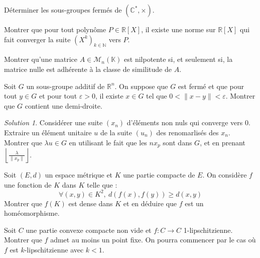 \documentclass[french]{book}
\newcommand{\N}{\mathbb{N}}
\newcommand{\R}{\mathbb{R}}
\newcommand{\C}{\mathbb{C}}
\newcommand{\K}{\mathbb{K}}
\newcommand{\st}{^*}
\theoremstyle{definition}
\theoremstyle{remark}
\newtheorem*{sol}{Solution}
\begin{document}
\begin{exo}[2]{}
	Déterminer les sous-groupes fermés de $(\C\st,\times)$.
\end{exo}

\begin{exo}[2]{}
	Montrer que pour tout polynôme $P\in\R[X]$, il existe une norme sur $\R[X]$ qui fait converger la suite $(X^k)_{k\in\N}$ vers $P$.
\end{exo}

\begin{exo}[2]{}
	Montrer qu'une matrice $A\in\mathcal{M}_n(\K)$ est nilpotente si, et seulement si, la matrice nulle est adhérente à la classe de similitude de $A$.
\end{exo}

\begin{exo}[2]{}
	Soit $G$ un sous-groupe additif de $\R^n$. On suppose que $G$ est fermé et que pour tout $y\in G$ et pour tout $\varepsilon>0$, il existe $x\in G$ tel que $0<\lVert x-y\rVert<\varepsilon$. Montrer que $G$ contient une demi-droite.
\end{exo}
\begin{sol}
	Considérer une suite $(x_n)$ d'éléments non nuls qui converge vers $0$. Extraire un élément unitaire $u$ de la suite $(u_n)$ des renomarlisés des $x_n$. Montrer que $\lambda u\in G$ en utilisant le fait que les $nx_p$ sont dans $G$, et en prenant $\displaystyle\left\lfloor\frac{\lambda}{\lVert x_p\rVert}\right\rfloor$.
\end{sol}

\begin{exo}[2]{}
	Soit $(E,d)$ un espace métrique et $K$ une partie compacte de $E$. On considère $f$ une fonction de $K$ dans $K$ telle que : $$\forall (x,y)\in K^2,\ d(f(x),f(y))\geqslant d(x,y)$$
	Montrer que $f(K)$ est dense dans $K$ et en déduire que $f$ est un homéomorphisme.
\end{exo}

\begin{exo}[3]{}
	Soit $C$ une partie convexe compacte non vide et $f:C\to C$ 1-lipschitzienne. Montrer que $f$ admet au moins un point fixe. On pourra commencer par le cas où $f$ est $k$-lipschitzienne avec $k<1$.
\end{exo}
\end{document}
